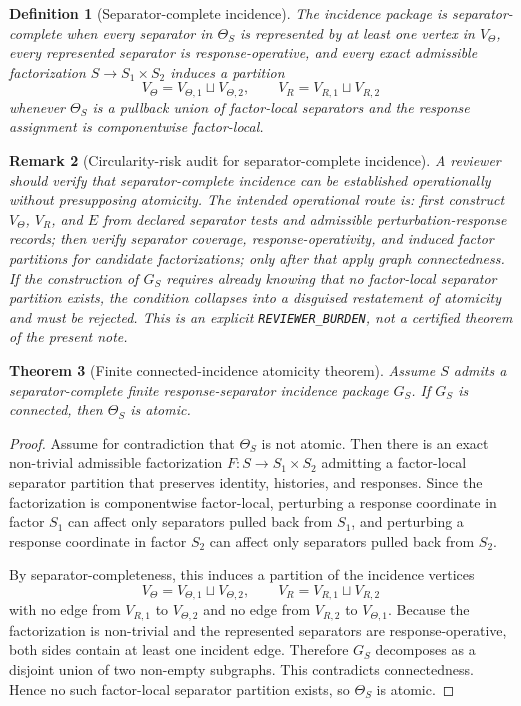 \documentclass[11pt]{article}
\newtheorem{definition}{Definition}[section]
\newtheorem{theorem}[definition]{Theorem}
\newtheorem{remark}[definition]{Remark}
\begin{document}
\begin{definition}[Separator-complete incidence]
The incidence package is separator-complete when every separator in $\Theta_S$ is represented by at least one vertex in $V_\Theta$, every represented separator is response-operative, and every exact admissible factorization $S\to S_1\times S_2$ induces a partition
\[
  V_\Theta=V_{\Theta,1}\sqcup V_{\Theta,2},\qquad V_R=V_{R,1}\sqcup V_{R,2}
\]
whenever $\Theta_S$ is a pullback union of factor-local separators and the response assignment is componentwise factor-local.
\end{definition}


\begin{remark}[Circularity-risk audit for separator-complete incidence]
A reviewer should verify that separator-complete incidence can be established operationally without presupposing atomicity. The intended operational route is: first construct $V_\Theta$, $V_R$, and $E$ from declared separator tests and admissible perturbation-response records; then verify separator coverage, response-operativity, and induced factor partitions for candidate factorizations; only after that apply graph connectedness. If the construction of $G_S$ requires already knowing that no factor-local separator partition exists, the condition collapses into a disguised restatement of atomicity and must be rejected. This is an explicit \texttt{REVIEWER\_BURDEN}, not a certified theorem of the present note.
\end{remark}

\begin{theorem}[Finite connected-incidence atomicity theorem]
Assume $S$ admits a separator-complete finite response-separator incidence package $G_S$. If $G_S$ is connected, then $\Theta_S$ is atomic.
\end{theorem}

\begin{proof}
Assume for contradiction that $\Theta_S$ is not atomic. Then there is an exact non-trivial admissible factorization $F:S\to S_1\times S_2$ admitting a factor-local separator partition that preserves identity, histories, and responses. Since the factorization is componentwise factor-local, perturbing a response coordinate in factor $S_1$ can affect only separators pulled back from $S_1$, and perturbing a response coordinate in factor $S_2$ can affect only separators pulled back from $S_2$.

By separator-completeness, this induces a partition of the incidence vertices
\[
  V_\Theta=V_{\Theta,1}\sqcup V_{\Theta,2},\qquad V_R=V_{R,1}\sqcup V_{R,2}
\]
with no edge from $V_{R,1}$ to $V_{\Theta,2}$ and no edge from $V_{R,2}$ to $V_{\Theta,1}$. Because the factorization is non-trivial and the represented separators are response-operative, both sides contain at least one incident edge. Therefore $G_S$ decomposes as a disjoint union of two non-empty subgraphs. This contradicts connectedness. Hence no such factor-local separator partition exists, so $\Theta_S$ is atomic.
\end{proof}
\end{document}
